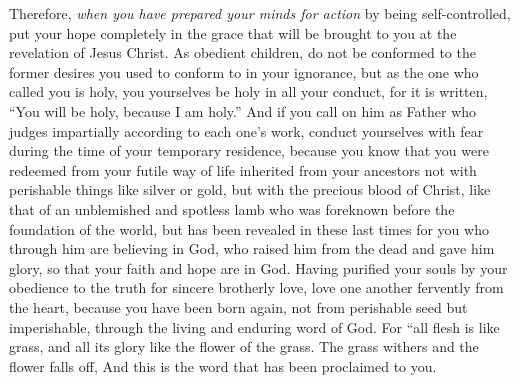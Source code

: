\begin{biblechapter}
 Therefore, \textit{when you have prepared your minds for action} by being self-controlled, put your hope completely in the grace that will be brought to you at the revelation of Jesus Christ.
\verse As obedient children, do not be conformed to the former desires you used to conform to in your ignorance,
\verse but as the one who called you is holy, you yourselves be holy in all your conduct,
\verse for it is written, “You will be holy, because I am holy.”
\verse And if you call on him as Father who judges impartially according to each one’s work, conduct yourselves with fear during the time of your temporary residence,
\verse because you know that you were redeemed from your futile way of life inherited from your ancestors not with perishable things like silver or gold,
\verse but with the precious blood of Christ, like that of an unblemished and spotless lamb
\verse who was foreknown before the foundation of the world, but has been revealed in these last times for you
\verse who through him are believing in God, who raised him from the dead and gave him glory, so that your faith and hope are in God.
\verse Having purified your souls by your obedience to the truth for sincere brotherly love, love one another fervently from the heart,
\verse because you have been born again, not from perishable seed but imperishable, through the living and enduring word of God.
\verse For
\verse “all flesh is like grass, 
and all its glory like the flower of the grass. 
The grass withers and the flower falls off, And this is the word that has been proclaimed to you.
\end{biblechapter}


